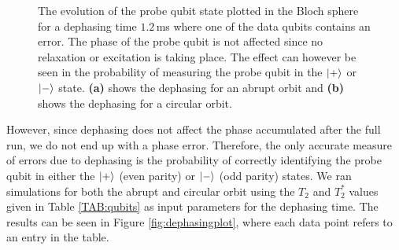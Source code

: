 \begin{figure}[H]
	\caption[oddeven]{The evolution of the probe qubit state plotted in the Bloch sphere for a dephasing time $1.2\, $ms where one of the data qubits contains an error. The phase of the probe qubit is not affected since no relaxation or excitation is taking place. The effect can however be seen in the probability of measuring the probe qubit in the $\ket{+}$ or $\ket{-}$ state. \textbf{(a)} shows the dephasing for an abrupt orbit and \textbf{(b)} shows the dephasing for a circular orbit.}
	\label{FIG:deph}
\end{figure}


However, since dephasing does not affect the phase accumulated after the full run, we do not end up with a phase error. Therefore, the only accurate measure of errors due to dephasing is the probability of correctly identifying the probe qubit in either the $\ket{+}$ (even parity) or $\ket{-}$ (odd parity) states. We ran simulations for both the abrupt and circular orbit using the $T_2$ and $T_2^*$ values given in Table \ref{TAB:qubits} as input parameters for the dephasing time. The results can be seen in Figure \ref{fig:dephasingplot}, where each data point refers to an entry in the table. 

